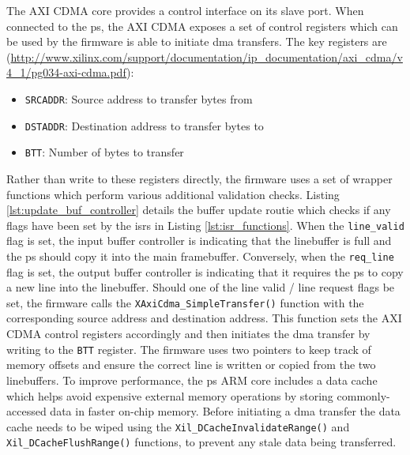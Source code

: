 The AXI CDMA core provides a control interface on its slave port. When connected to the \gls{ps}, the AXI CDMA exposes a set of control registers which can be used by the firmware is able to initiate \gls{dma} transfers. The key registers are (\url{http://www.xilinx.com/support/documentation/ip_documentation/axi_cdma/v4_1/pg034-axi-cdma.pdf}):
\begin{itemize}
  \item \texttt{SRCADDR}: Source address to transfer bytes from
  \item \texttt{DSTADDR}: Destination address to transfer bytes to 
  \item \texttt{BTT}: Number of bytes to transfer
\end{itemize}

Rather than write to these registers directly, the firmware uses a set of wrapper functions which perform various additional validation checks. Listing \ref{lst:update_buf_controller} details the buffer update routie which checks if any flags have been set by the \glspl{isr} in Listing \ref{lst:isr_functions}. When the \texttt{line\_valid} flag is set, the input buffer controller is indicating that the linebuffer is full and the \gls{ps} should copy it into the main framebuffer. Conversely, when the \texttt{req\_line} flag is set, the output buffer controller is indicating that it requires the \gls{ps} to copy a new line into the linebuffer. Should one of the line valid / line request flags be set, the firmware calls the \texttt{XAxiCdma\_SimpleTransfer()} function with the corresponding source address and destination address. This function sets the AXI CDMA control registers accordingly and then initiates the \gls{dma} transfer by writing to the \texttt{BTT} register. The firmware uses two pointers to keep track of memory offsets and ensure the correct line is written or copied from the two linebuffers. To improve performance, the \gls{ps} ARM core includes a data cache which helps avoid expensive external memory operations by storing commonly-accessed data in faster on-chip memory. Before initiating a \gls{dma} transfer the data cache needs to be wiped using the \texttt{Xil\_DCacheInvalidateRange()} and \texttt{Xil\_DCacheFlushRange()} functions, to prevent any stale data being transferred.

